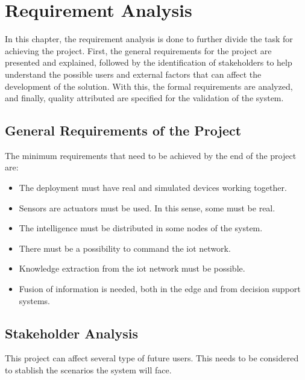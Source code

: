 \section{Requirement Analysis}

In this chapter, the requirement analysis is done to further divide the task for achieving the project. First, the general 
requirements for the project are presented and explained, followed by the identification of stakeholders to help understand 
the possible users and external factors that can affect the development of the solution. With this, the formal 
requirements are analyzed, and finally, quality attributed are specified for the validation of the system.

\subsection{General Requirements of the Project}

The minimum requirements that need to be achieved by the end of the project are:
\begin{itemize}
    \item The deployment must have real and simulated devices working together.
    \item Sensors are actuators must be used. In this sense, some must be real.
    \item The intelligence must be distributed in some nodes of the system.
    \item There must be a possibility to command the \acrshort{iot} network.
    \item Knowledge extraction from the \acrshort{iot} network must be possible.
    \item Fusion of information is needed, both in the edge and from decision support systems. 
\end{itemize}

\subsection{Stakeholder Analysis}

This project can affect several type of future users. This needs to be considered to stablish the scenarios the system will face. 

